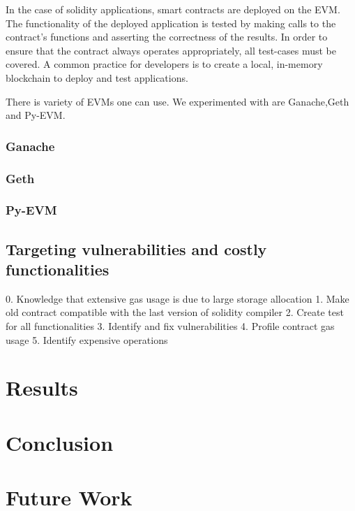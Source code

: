 \documentclass{article}
\begin{document}
In the case of solidity applications, smart contracts are deployed on the EVM. The functionality of the deployed application is tested by making calls to the contract's functions and asserting the correctness of the results. In order to ensure that the contract always operates appropriately, all test-cases must be covered. A common practice for developers is to create a local, in-memory blockchain to deploy and test applications.

There is variety of EVMs one can use. We experimented with are Ganache,Geth and Py-EVM.

\subsubsection{Ganache}
\subsubsection{Geth}
\subsubsection{Py-EVM}

\subsection{Targeting vulnerabilities and costly functionalities}

0. Knowledge that extensive gas usage is due to large storage allocation
1. Make old contract compatible with the last version of solidity compiler
2. Create test for all functionalities
3. Identify and fix vulnerabilities
4. Profile contract gas usage
5. Identify expensive operations

\section{Results}
\section{Conclusion}
\section{Future Work}
\end{document}
